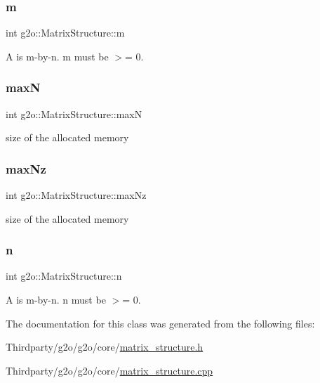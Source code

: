 \subsubsection{\texorpdfstring{m}{m}}
{\footnotesize\ttfamily int g2o\+::\+Matrix\+Structure\+::m}



A is m-\/by-\/n. m must be $>$= 0. 

\mbox{\label{classg2o_1_1_matrix_structure_a098e58ed3d37bf957307a64f7dc55f32}} 
\subsubsection{\texorpdfstring{maxN}{maxN}}
{\footnotesize\ttfamily int g2o\+::\+Matrix\+Structure\+::maxN\hspace{0.3cm}{\ttfamily [protected]}}



size of the allocated memory 

\mbox{\label{classg2o_1_1_matrix_structure_a049708086bd4123721351d0580ce5ba1}} 
\subsubsection{\texorpdfstring{max\+Nz}{maxNz}}
{\footnotesize\ttfamily int g2o\+::\+Matrix\+Structure\+::max\+Nz\hspace{0.3cm}{\ttfamily [protected]}}



size of the allocated memory 

\mbox{\label{classg2o_1_1_matrix_structure_aa91f296406c17ab3a826d03bf75cfea7}} 
\subsubsection{\texorpdfstring{n}{n}}
{\footnotesize\ttfamily int g2o\+::\+Matrix\+Structure\+::n}



A is m-\/by-\/n. n must be $>$= 0. 



The documentation for this class was generated from the following files\+:\begin{DoxyCompactItemize}
\item 
Thirdparty/g2o/g2o/core/\mbox{\hyperlink{matrix__structure_8h}{matrix\+\_\+structure.\+h}}\item 
Thirdparty/g2o/g2o/core/\mbox{\hyperlink{matrix__structure_8cpp}{matrix\+\_\+structure.\+cpp}}\end{DoxyCompactItemize}
